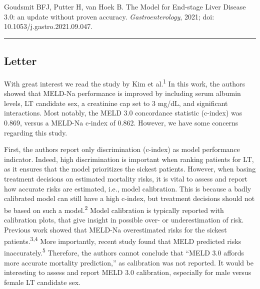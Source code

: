 \documentclass[11pt,english,]{book} %
\begin{document}
\noindent  Goudsmit BFJ, Putter H, van Hoek B. The Model for End-stage Liver Disease 3.0: an update without proven accuracy. \emph{Gastroenterology}, 2021; doi: 10.1053/j.gastro.2021.09.047.

\begin{center}\rule{0.5\linewidth}{0.5pt}\end{center}

\newpage

\hypertarget{letter}{%
\subsection*{Letter}\label{letter}}

With great interest we read the study by Kim et al.\textsuperscript{1} In this work, the authors showed that MELD-Na performance is improved by including serum albumin levels, LT candidate sex, a creatinine cap set to 3 mg/dL, and significant interactions. Most notably, the MELD 3.0 concordance statistic (c-index) was 0.869, versus a MELD-Na c-index of 0.862. However, we have some concerns regarding this study.

First, the authors report only discrimination (c-index) as model performance indicator. Indeed, high discrimination is important when ranking patients for LT, as it ensures that the model prioritizes the sickest patients. However, when basing treatment decisions on estimated mortality risks, it is vital to assess and report how accurate risks are estimated, i.e., model calibration. This is because a badly calibrated model can still have a high c-index, but treatment decisions should not be based on such a model.\textsuperscript{2} Model calibration is typically reported with calibration plots, that give insight in possible over- or underestimation of risk. Previous work showed that MELD-Na overestimated risks for the sickest patients.\textsuperscript{3,4} More importantly, recent study found that MELD predicted risks inaccurately.\textsuperscript{5} Therefore, the authors cannot conclude that ``MELD 3.0 affords more accurate mortality prediction,'' as calibration was not reported. It would be interesting to assess and report MELD 3.0 calibration, especially for male versus female LT candidate sex.
\end{document}
